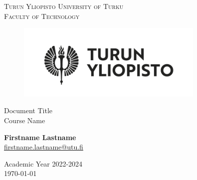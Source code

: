 \documentclass[12pt]{report}
\makeatletter
\newcommand{\faculty}{Faculty of Technology}
\newcommand{\course}{Course Name}
\newcommand{\academicyear}{2022-2024}
\newcommand{\documenttitle}{Document Title}
\newcommand{\authorname}{Firstname Lastname}
\newcommand{\authoremail}{firstname.lastname@utu.fi}
\makeatother
\begin{document}
	\begin{titlepage}
		\begin{center}
			\textsc{Turun Yliopisto \textemdash \hspace{1mm} University of Turku} \\
			\textsc{\faculty}
		\end{center}
		\begin{figure}[h]
			\vspace{10mm}
			
			\centering\includegraphics[width=0.8\textwidth]{logo-fi.png}

			\vspace{20mm}
		\end{figure}
		\begin{center}
			\fontsize{10mm}{7mm}\selectfont
			\textup{\documenttitle} \\
			\textnormal{ \Large{\course}} \\

			\vspace{30mm}

			\large{\textbf{\authorname}} \\
			\large{\href{mailto:\authoremail}{\authoremail}} \\
			
			\vspace{35mm}
			
			\large{Academic Year \academicyear} \\
			\today
		\end{center}
	\end{titlepage}
\end{document}
